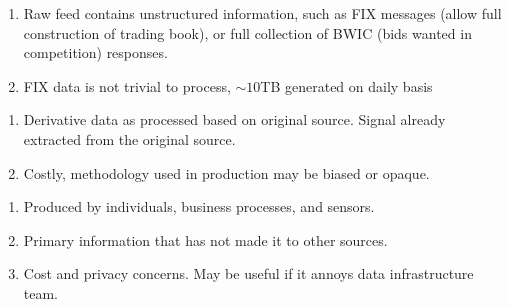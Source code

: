 \documentclass[a4paper,oneside,openany]{book}
\begin{document}
\begin{remark} 
\begin{enumerate}[label=\roman*.]
\setlength{\itemsep}{0pt}
\item Raw feed contains unstructured information, such as FIX messages (allow full construction of trading book), or full collection of BWIC (bids wanted in competition) responses.
\item FIX data is not trivial to process, $\sim 10$TB generated on daily basis
\end{enumerate}
\end{remark}

\begin{remark} 
\begin{enumerate}[label=\roman*.]
\setlength{\itemsep}{0pt}
\item Derivative data as processed based on original source. Signal already extracted from the original source.
\item Costly, methodology used in production may be biased or opaque.
\end{enumerate}
\end{remark}

\begin{remark} 
\begin{enumerate}[label=\roman*.]
\setlength{\itemsep}{0pt}
\item Produced by individuals, business processes, and sensors.
\item Primary information that has not made it to other sources.
\item Cost and privacy concerns. May be useful if it annoys data infrastructure team.
\end{enumerate}
\end{remark}
\end{document}
